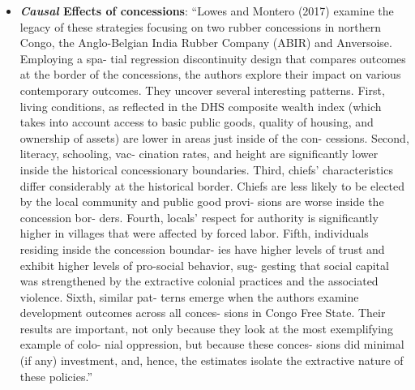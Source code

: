 \documentclass[11pt,a4paper]{article}
\begin{document}
\begin{itemize}
		\item \textbf{\emph{Causal} Effects of concessions}: ``Lowes and Montero (2017) examine the legacy of these strategies focusing on two rubber concessions in northern Congo, the Anglo-Belgian India Rubber Company (ABIR) and Anversoise. Employing a spa- tial regression discontinuity design that compares outcomes at the border of the concessions, the authors explore their impact on various contemporary outcomes. They uncover several interesting patterns. First, living conditions, as reflected in the DHS composite wealth index (which takes into account access to basic public goods, quality of housing, and ownership of assets) are lower in areas just inside of the con- cessions. Second, literacy, schooling, vac- cination rates, and height are significantly lower inside the historical concessionary boundaries. Third, chiefs’ characteristics differ considerably at the historical border. Chiefs are less likely to be elected by the local community and public good provi- sions are worse inside the concession bor- ders. Fourth, locals’ respect for authority is significantly higher in villages that were affected by forced labor. Fifth, individuals residing inside the concession boundar- ies have higher levels of trust and exhibit higher levels of pro-social behavior, sug- gesting that social capital was strengthened by the extractive colonial practices and the associated violence. Sixth, similar pat- terns emerge when the authors examine development outcomes across all conces- sions in Congo Free State. Their results are important, not only because they look at the most exemplifying example of colo- nial oppression, but because these conces- sions did minimal (if any) investment, and, hence, the estimates isolate the extractive nature of these policies.'' \parencite[64]{Michalopoulos2020}
	\end{itemize}
	\clearpage
	\printbibliography
	
\end{document}
